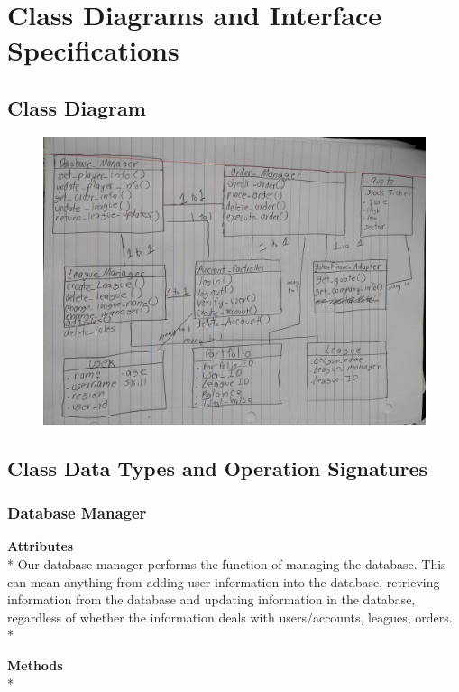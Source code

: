 \chapter{Class Diagrams and Interface Specifications}

\section{Class Diagram}
\begin{figure}[h]
\centering
\includegraphics[width=5.5in]{./img/classDiagram.jpg}
\end{figure}


\clearpage

\section{Class Data Types and Operation Signatures}

\subsection{Database Manager}
{\bfseries Attributes} \\*
Our database manager performs the function of managing the
database.  This can mean anything from adding user
information into the database, retrieving information from
the database and updating information in the database,
regardless of whether the information deals with users/accounts,
leagues, orders. \\*

{\bfseries Methods} \\*

